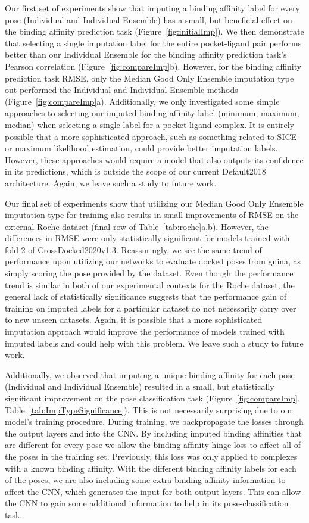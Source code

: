 \documentclass[journal=jcim,manuscript=article]{achemso}
\begin{document}
Our first set of experiments show that imputing a binding affinity label for every pose (Individual and Individual Ensemble) has a small, but beneficial effect on the binding affinity prediction task (Figure~\ref{fig:initialImp}).
We then demonstrate that selecting a single imputation label for the entire pocket-ligand pair performs better than our Individual Ensemble for the binding affinity prediction task's Pearson correlation (Figure~\ref{fig:compareImp}b).
However, for the binding affinity prediction task RMSE, only the Median Good Only Ensemble imputation type out performed the Individual and Individual Ensemble methods (Figure~\ref{fig:compareImp}a).
Additionally, we only investigated some simple approaches to selecting our imputed binding affinity label (minimum, maximum, median) when selecting a single label for a pocket-ligand complex.
It is entirely possible that a more sophisticated approach, such as something related to SICE\cite{SICE} or maximum likelihood estimation, could provide better imputation labels.
However, these approaches would require a model that also outputs its confidence in its predictions, which is outside the scope of our current Default2018 architecture.
Again, we leave such a study to future work.

Our final set of experiments show that utilizing our Median Good Only Ensemble imputation type for training also results in small improvements of RMSE on the external Roche dataset (final row of Table~\ref{tab:roche}a,b).
However, the differences in RMSE were only statistically significant for models trained with fold 2 of CrossDocked2020v1.3.
Reassuringly, we see the same trend of performance upon utilizing our networks to evaluate docked poses from gnina, as simply scoring the pose provided by the dataset.
Even though the performance trend is similar in both of our experimental contexts for the Roche dataset, the general lack of statistically significance suggests that the performance gain of training on imputed labels for a particular dataset do not necessarily carry over to new unseen datasets.
Again, it is possible that a more sophisticated imputation approach would improve the performance of models trained with imputed labels and could help with this problem.
We leave such a study to future work.

Additionally, we observed that imputing a unique binding affinity for each pose (Individual and Individual Ensemble) resulted in a small, but statistically significant improvement on the pose classification task (Figure~\ref{fig:compareImp}, Table~\ref{tab:ImpTypeSignificance}).
This is not necessarily surprising due to our model's training procedure.
During training, we backpropagate the losses through the output layers and into the CNN.
By including imputed binding affinities that are different for every pose we allow the binding affinity hinge loss to affect all of the poses in the training set.
Previously, this loss was only applied to complexes with a known binding affinity.
With the different binding affinity labels for each of the poses, we are also including some extra binding affinity information to affect the CNN, which generates the input for both output layers.
This can allow the CNN to gain some additional information to help in its pose-classification task.
\end{document}
